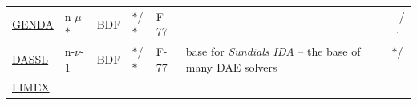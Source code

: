 \documentclass[]{book}
\theoremstyle{definition}
\theoremstyle{definition}
\theoremstyle{definition}
\theoremstyle{remark}
\begin{document}
\begin{longtable}[]{@{}llllllc@{}}
\begin{minipage}[t]{0.07\columnwidth}
\href{https://www3.math.tu-berlin.de/cgi-bin/IfM/show_abstract.cgi?Report-730-2002.rdf.html}{GENDA}\strut
\end{minipage} & \begin{minipage}[t]{0.07\columnwidth}\raggedright\strut
n-\(\mu\)-\(*\)\strut
\end{minipage} & \begin{minipage}[t]{0.10\columnwidth}\raggedright\strut
BDF\strut
\end{minipage} & \begin{minipage}[t]{0.06\columnwidth}\raggedright\strut
\(*\)/\(*\)\strut
\end{minipage} & \begin{minipage}[t]{0.07\columnwidth}\raggedright\strut
F-77\strut
\end{minipage} & \begin{minipage}[t]{0.37\columnwidth}\raggedright\strut
\strut
\end{minipage} & \begin{minipage}[t]{0.06\columnwidth}\centering\strut
\(\phantom{*}\)/\(\cdot\)\strut
\end{minipage}\tabularnewline
\begin{minipage}[t]{0.07\columnwidth}\raggedright\strut
\href{http://www.netlib.org/ode/ddassl.f}{DASSL}\strut
\end{minipage} & \begin{minipage}[t]{0.07\columnwidth}\raggedright\strut
n-\(\nu\)-\(1\)\strut
\end{minipage} & \begin{minipage}[t]{0.10\columnwidth}\raggedright\strut
BDF\strut
\end{minipage} & \begin{minipage}[t]{0.06\columnwidth}\raggedright\strut
\(*\)/\(*\)\strut
\end{minipage} & \begin{minipage}[t]{0.07\columnwidth}\raggedright\strut
F-77\strut
\end{minipage} & \begin{minipage}[t]{0.37\columnwidth}\raggedright\strut
base for \emph{Sundials IDA} -- the base of many DAE solvers\strut
\end{minipage} & \begin{minipage}[t]{0.06\columnwidth}\centering\strut
\(*\)/\(\phantom{\cdot}\)\strut
\end{minipage}\tabularnewline
\begin{minipage}[t]{0.07\columnwidth}\raggedright\strut
\href{https://doi.org/10.1007/BF01400352}{LIMEX}\strut

\end{minipage}
\end{longtable}
\end{document}
